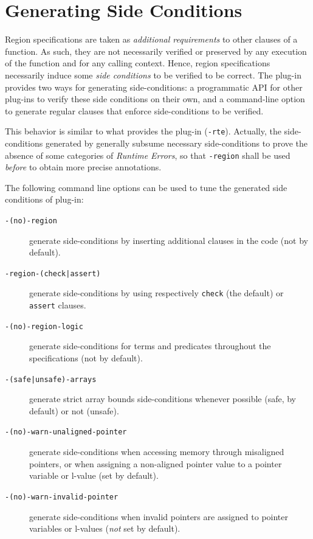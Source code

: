 \pagebreak
\section{Generating Side Conditions}
\label{toc:commandline}

Region specifications are taken as \emph{additional requirements} to other
\acsl clauses of a function. As such, they are not necessarily verified
or preserved by any execution of the function and for any calling context.
Hence, region specifications necessarily induce some \emph{side conditions} to
be verified to be correct. The \Region plug-in provides two ways for
generating side-conditions: a programmatic \textsf{API} for other
\FramaC plug-ins to verify these side conditions on their own, and a
command-line option to generate regular \acsl clauses that enforce
side-conditions to be verified.

This behavior is similar to what provides the \rte plug-in
(\verb+-rte+). Actually, the side-conditions generated by \Region
generally subsume necessary side-conditions to prove the absence of some
categories of \emph{Runtime Errors}, so that \verb+-region+ shall be used
\emph{before} \rte to obtain more precise annotations.

The following command line options can be used to tune the generated side
conditions of \Region plug-in:

\begin{description}
\item[\texttt{-(no)-region}] generate side-conditions by inserting additional
  \acsl clauses in the code (not by default).
\item[\texttt{-region-(check|assert)}] generate side-conditions by using respectively
  \verb+check+ (the default) or \verb+assert+ clauses.
\item[\texttt{-(no)-region-logic}] generate side-conditions for \acsl
  terms and predicates throughout the specifications (not by default).
\item[\texttt{-(safe|unsafe)-arrays}] generate strict array bounds
  side-conditions whenever possible (safe, by default) or not (unsafe).
\item[\texttt{-(no)-warn-unaligned-pointer}] generate side-conditions when
  accessing memory through misaligned pointers, or when assigning a non-aligned
  pointer value to a pointer variable or l-value (set by default).
\item[\texttt{-(no)-warn-invalid-pointer}] generate side-conditions when invalid
  pointers are assigned to pointer variables or l-values (\emph{not} set by
  default).
\end{description}
